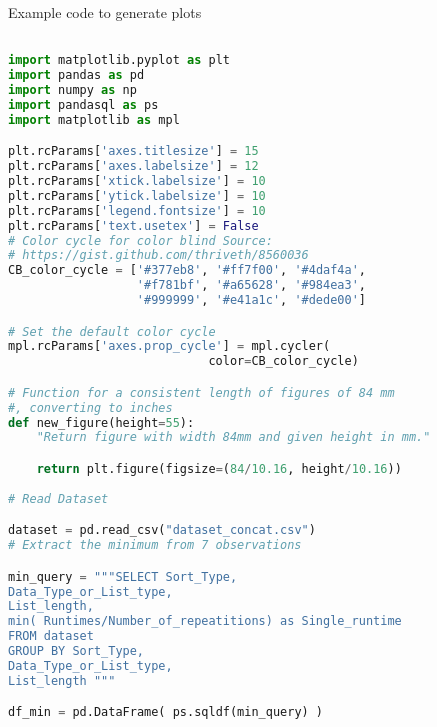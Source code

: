 \documentclass[sigconf, nonacm, natbib, screen, balance=False]{acmart}
\begin{document}
\begin{listing}
  \caption{Example code to generate plots}
  \label{plot function01}
\begin{lstlisting}[language=Python]

import matplotlib.pyplot as plt
import pandas as pd
import numpy as np
import pandasql as ps
import matplotlib as mpl

plt.rcParams['axes.titlesize'] = 15
plt.rcParams['axes.labelsize'] = 12
plt.rcParams['xtick.labelsize'] = 10
plt.rcParams['ytick.labelsize'] = 10
plt.rcParams['legend.fontsize'] = 10
plt.rcParams['text.usetex'] = False
# Color cycle for color blind Source:
# https://gist.github.com/thriveth/8560036
CB_color_cycle = ['#377eb8', '#ff7f00', '#4daf4a',
                  '#f781bf', '#a65628', '#984ea3',
                  '#999999', '#e41a1c', '#dede00']  

# Set the default color cycle
mpl.rcParams['axes.prop_cycle'] = mpl.cycler(
                            color=CB_color_cycle) 

# Function for a consistent length of figures of 84 mm
#, converting to inches
def new_figure(height=55):
    "Return figure with width 84mm and given height in mm."

    return plt.figure(figsize=(84/10.16, height/10.16))
    
# Read Dataset 

dataset = pd.read_csv("dataset_concat.csv")
# Extract the minimum from 7 observations

min_query = """SELECT Sort_Type, 
Data_Type_or_List_type,
List_length, 
min( Runtimes/Number_of_repeatitions) as Single_runtime
FROM dataset 
GROUP BY Sort_Type, 
Data_Type_or_List_type,
List_length """

df_min = pd.DataFrame( ps.sqldf(min_query) )
\end{lstlisting}
\end{listing}
\end{document}
